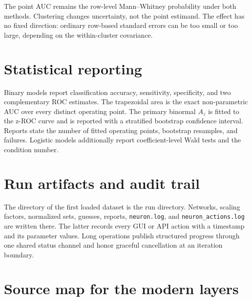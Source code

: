 The point AUC remains the row-level Mann--Whitney probability under
both methods.  Clustering changes uncertainty, not the point estimand.
The effect has no fixed direction: ordinary row-based standard errors
can be too small or too large, depending on the within-cluster
covariance.

\section{Statistical reporting}

Binary models report classification accuracy, sensitivity,
specificity, and two complementary ROC estimates.  The trapezoidal
area is the exact non-parametric AUC over every distinct operating
point.  The primary binormal $A_z$ is fitted to the z-ROC curve and is
reported with a stratified bootstrap confidence interval.  Reports
state the number of fitted operating points, bootstrap resamples, and
failures.  Logistic models additionally report coefficient-level Wald
tests and the condition number.

\section{Run artifacts and audit trail}

The directory of the first loaded dataset is the run directory.
Networks, scaling factors, normalized sets, guesses, reports,
\texttt{neuron.log}, and \texttt{neuron\_actions.log} are written
there.  The latter records every GUI or API action with a timestamp and
its parameter values.  Long operations publish structured progress
through one shared status channel and honor graceful cancellation at
an iteration boundary.

\section{Source map for the modern layers}

